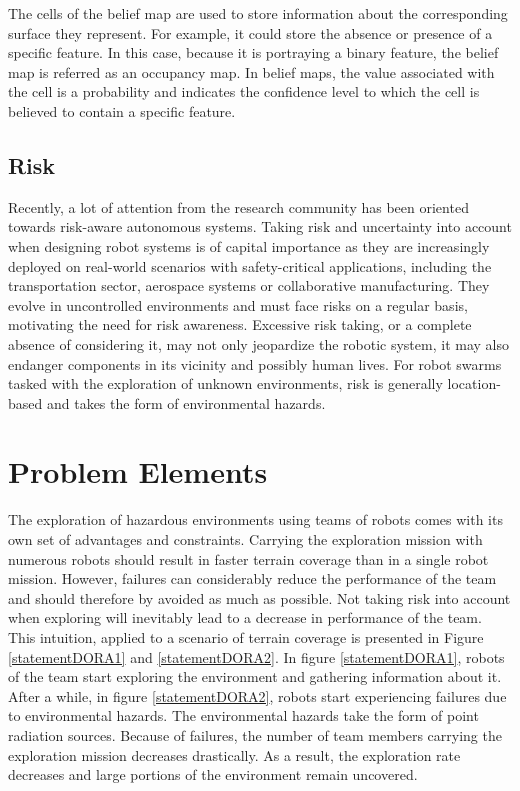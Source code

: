 The cells of the belief map are used to store information about the corresponding surface they represent. For example, it could store the absence or presence of a specific feature. In this case, because it is portraying a binary feature, the belief map is referred as an occupancy map. In belief maps, the value associated with the cell is a probability and indicates the confidence level to which the cell is believed to contain a specific feature.

\subsection{Risk}
Recently, a lot of attention from the research community has been oriented towards risk-aware autonomous systems. Taking risk and uncertainty into account when designing robot systems is of capital importance as they are increasingly deployed on real-world scenarios with safety-critical applications, including the transportation sector, aerospace systems or collaborative manufacturing. They evolve in uncontrolled environments and must face risks on a regular basis, motivating the need for risk awareness. Excessive risk taking, or a complete absence of considering it, may not only jeopardize the robotic system, it may also endanger components in its vicinity and possibly human lives. For robot swarms tasked with the exploration of unknown environments, risk is generally location-based and takes the form of environmental hazards. 


\section{Problem Elements}
The exploration of hazardous environments using teams of robots comes with its own set of advantages and constraints. Carrying the exploration mission with numerous robots should result in faster terrain coverage than in a single robot mission.  However, failures can considerably reduce the performance of the team and should therefore by avoided as much as possible. Not taking risk into account when exploring will inevitably lead to a decrease in performance of the team. This intuition, applied to a scenario of terrain coverage is presented in Figure \ref{statementDORA1} and \ref{statementDORA2}. In figure \ref{statementDORA1}, robots of the team start exploring the environment and gathering information about it. After a while, in figure \ref{statementDORA2}, robots start experiencing failures due to environmental hazards. The environmental hazards take the form of point radiation sources. Because of failures, the number of team members carrying the exploration mission decreases drastically. As a result, the exploration rate decreases and large portions of the environment remain uncovered. 

